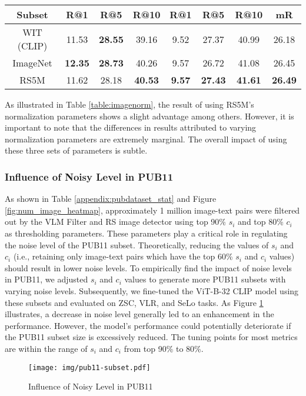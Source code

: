\documentclass[journal]{IEEEtran}
\begin{document}
\begin{table}[ht]
\begin{tabular}{cccccccc}
\midrule
\textbf{Subset} &  {R@1} & {R@5} & {R@10} & {R@1} & {R@5} & {R@10} & {mR} \\
 \midrule
  WIT (CLIP) & 11.53  &	\textbf{28.55} 	& 39.16  & 	9.52  & 	27.37 	& 40.99  &	26.18 \\
 ImageNet &\textbf{12.35}	&\textbf{28.73}	&40.26	&9.57	&26.72	&41.08	&26.45\\
 RS5M &11.62	&28.18	&\textbf{40.53}&	\textbf{9.57}&	\textbf{27.43}&	\textbf{41.61} & \textbf{26.49} \\
\bottomrule
\end{tabular}
\end{table}



As illustrated in Table \ref{table:imagenorm}, the result of using RS5M's normalization parameters shows a slight advantage among others. However, it is important to note that the differences in results attributed to varying normalization parameters are extremely marginal. The overall impact of using these three sets of parameters is subtle.

\subsubsection{Influence of Noisy Level in PUB11} As shown in Table \ref{appendix:pubdataset_stat} and Figure \ref{fig:num_image_heatmap}, approximately 1 million image-text pairs were filtered out by the VLM Filter and RS image detector using top 90\% $s_i$ and top 80\% $c_i$ as thresholding parameters. These parameters play a critical role in regulating the noise level of the PUB11 subset. Theoretically, reducing the values of $s_i$ and $c_i$ (i.e., retaining only image-text pairs which have the top 60\% $s_i$ and $c_i$ values) should result in lower noise levels. To empirically find the impact of noise levels in PUB11, we adjusted $s_i$ and $c_i$ values to generate more PUB11 subsets with varying noise levels. Subsequently, we fine-tuned the ViT-B-32 CLIP model using these subsets and evaluated on ZSC, VLR, and SeLo tasks. As Figure \ref{fig:noise_level} illustrates, a decrease in noise level generally led to an enhancement in the performance. However, the model's performance could potentially deteriorate if the PUB11 subset size is excessively reduced. The tuning points for most metrics are within the range of $s_i$ and $c_i$ from top 90\% to 80\%.

\begin{figure}
    \centering
    \texttt{[image: img/pub11-subset.pdf]}
    \caption{Influence of Noisy Level in PUB11}
    \label{fig:noise_level}
\end{figure}
\end{document}
